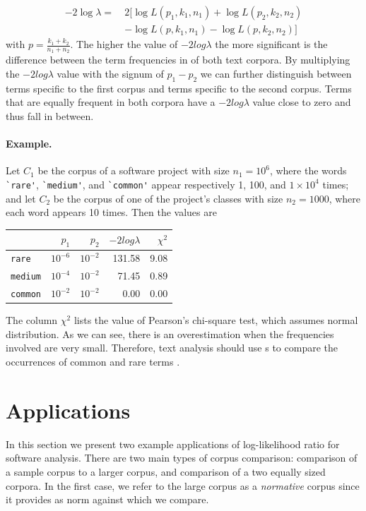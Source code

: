 \begin{align*}
-2 \log \lambda =~&2 \big[ \log L(p_1,k_1,n_1) + \log L(p_2,k_2,n_2)\\
 &- \log L(p,k_1,n_1) - \log L(p,k_2,n_2) \big] 
\end{align*}
\noindent
with $p = \frac{k_1 + k_2}{n_1 + n_2}$. The higher the value of $-2log\lambda$ the more significant is the difference between the term frequencies in of both text corpora. By multiplying the $-2log\lambda$ value with the signum of $p_1 - p_2$ we can further distinguish between terms specific to the first corpus and terms specific to the second corpus. Terms that are equally frequent in both corpora have a $-2log\lambda$ value close to zero and thus fall in between.

\paragraph{Example.} Let $C_1$ be the corpus of a software project with size $n_1 = 10^6$, where the words \verb$`rare'$, \verb$`medium'$, and \verb$`common'$ appear respectively 1, 100, and $1\times10^4$ times; and let $C_2$ be the corpus of one of the project's classes with size $n_2 = 1000$, where each word appears 10 times. Then the \loglr{} values are

\begin{center}
\begin{tabular}{l | rrrr}
~ & $p_1$ & $p_2$ & $-2log\lambda$ & $\chi^2$ \\ 
\hline
\verb$rare$ & $10^{-6}$ & $10^{-2}$  & 131.58 & 9.08 \\
\verb$medium$ & $10^{-4}$ & $10^{-2}$  & 71.45 & 0.89 \\
\verb$common$ & $10^{-2}$ & $10^{-2}$  & 0.00 & 0.00 \\
\end{tabular}
\end{center}

The column $\chi^2$ lists the value of Pearson's chi-square test, which assumes normal distribution. As we can see, there is an overestimation when the frequencies involved are very small. Therefore, text analysis should use \loglr{}s to compare the occurrences of common and rare terms \cite{Dunning}.


\section{Applications}\label{applications}

In this section we present two example applications of log-likelihood ratio for software analysis.
There are two main types of corpus comparison: comparison of a sample corpus to a larger corpus, and comparison of a two equally sized corpora. In the first case, we refer to the large corpus as a \emph{normative} corpus since it provides as norm against which we compare.

